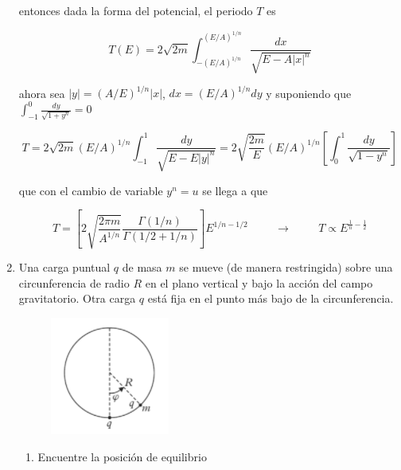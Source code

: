 \documentclass[12pt,a4paper]{article}
\begin{document}
\begin{enumerate}
entonces dada la forma del potencial, el periodo $T$ es

\begin{equation*}
    T (E) = 2 \sqrt{2m}  \int_{-(E/A)^{1/n}}^{(E/A)^{1/n}} \frac{dx}{\sqrt{E - A|x|^n}}
\end{equation*}

ahora sea $|y| = (A/E)^{1/n} |x|$, $dx = (E/A)^{1/n}dy$ y suponiendo que $\int_{-1}^{0} \frac{dy}{\sqrt{1 + y^n}} = 0$

\begin{equation*}
    T = 2\sqrt{2m} (E/A)^{1/n} \int_{-1}^{1} \frac{dy}{\sqrt{E - E|y|^n}} = 2 \sqrt{\frac{2m}{E}} (E/A)^{1/n} \left[ \int_{0}^{1} \frac{dy}{\sqrt{1 - y^n}}  \right]
\end{equation*}

que con el cambio de variable $y^n = u$ se llega a que

\begin{equation*}
    T = \left[2 \sqrt{\frac{2 \pi m}{ A^{1/n}}} \frac{\Gamma (1/n) }{\Gamma(1/2 + 1/n)} \right] E ^{1/n - 1/2} \hspace{1cm} \rightarrow \hspace{1cm} T \propto E^{\frac{1}{n} - \frac{1}{2}}
\end{equation*}








\item Una carga puntual $q$ de masa $m$ se mueve (de manera restringida) sobre una circunferencia de radio $R$ en el plano vertical y bajo la acción del campo gravitatorio. Otra carga $q$ está fija en el punto más bajo de la circunferencia. 

\begin{figure}[h!]
    \centering
    \includegraphics{8.PNG}
\end{figure}

\begin{enumerate}
    \item Encuentre la posición de equilibrio
    

\end{enumerate}
\end{enumerate}
\end{document}
